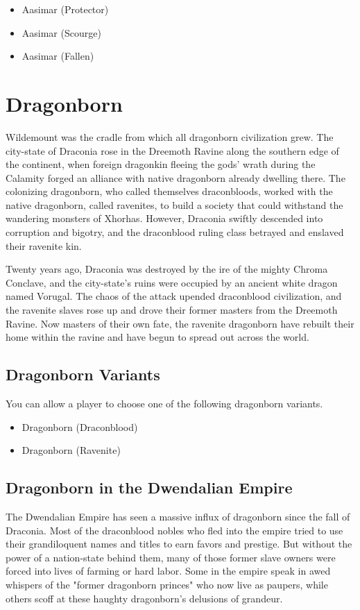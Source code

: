 \documentclass[10pt,a4paper,twoside,bg=print,twocolumn,openany,nodeprecatedcode]{dndbook}
\begin{document}
\begin{itemize}
\item Aasimar (Protector)
\item Aasimar (Scourge)
\item Aasimar (Fallen)
\end{itemize}

\section{Dragonborn}
Wildemount was the cradle from which all dragonborn civilization grew. The city-state of Draconia rose in the Dreemoth Ravine along the southern edge of the continent, when foreign dragonkin fleeing the gods' wrath during the Calamity forged an alliance with native dragonborn already dwelling there. The colonizing dragonborn, who called themselves draconbloods, worked with the native dragonborn, called ravenites, to build a society that could withstand the wandering monsters of Xhorhas. However, Draconia swiftly descended into corruption and bigotry, and the draconblood ruling class betrayed and enslaved their ravenite kin.

Twenty years ago, Draconia was destroyed by the ire of the mighty Chroma Conclave, and the city-state's ruins were occupied by an ancient white dragon named Vorugal. The chaos of the attack upended draconblood civilization, and the ravenite slaves rose up and drove their former masters from the Dreemoth Ravine. Now masters of their own fate, the ravenite dragonborn have rebuilt their home within the ravine and have begun to spread out across the world.

\subsection{Dragonborn Variants}
You can allow a player to choose one of the following dragonborn variants.


\begin{itemize}
\item Dragonborn (Draconblood)
\item Dragonborn (Ravenite)
\end{itemize}

\subsection{Dragonborn in the Dwendalian Empire}
The Dwendalian Empire has seen a massive influx of dragonborn since the fall of Draconia. Most of the draconblood nobles who fled into the empire tried to use their grandiloquent names and titles to earn favors and prestige. But without the power of a nation-state behind them, many of those former slave owners were forced into lives of farming or hard labor. Some in the empire speak in awed whispers of the "former dragonborn princes" who now live as paupers, while others scoff at these haughty dragonborn's delusions of grandeur.
\end{document}

